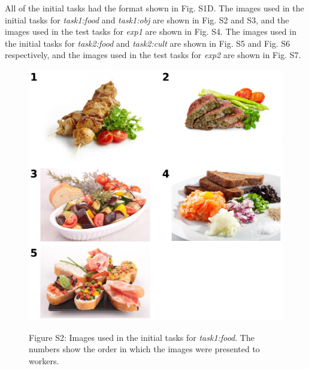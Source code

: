 \documentclass[12pt]{article}
\begin{document}
All of the initial tasks had the format shown in Fig. S1D.  The images used
in the initial tasks for \textit{task1:food} and \textit{task1:obj} are
shown in Fig. S2 and S3, and the images used in the test tasks for 
\textit{exp1} are shown in Fig. S4.  The images used in the initial tasks
for \textit{task2:food} and \textit{task2:cult} are shown in Fig. S5 and
Fig. S6 respectively, and the images used in the test tasks for \textit{exp2} 
are shown in Fig. S7.

\begin{figure}
	\includegraphics{figs/task1-food.pdf}
	\label{fig:task1:food}
	\caption{
		Figure S2: Images used in the initial tasks for 
		\textit{task1:food}.  The numbers show the order in which the 
		images were presented to workers.
	}
\end{figure}
\end{document}
